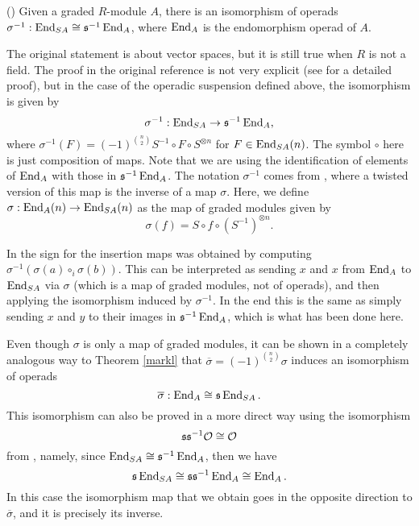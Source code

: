 \documentclass[join.tex]{subfiles}
\begin{document}
\begin{thm}\label{markl}(\cite[Chapter 3, Lemma 3.16]{operads})
Given a graded $R$-module $A$, there is an isomorphism of operads $\sigma^{-1}:\operatorname{End}_{S A}\cong \mathfrak{s}^{-1}\operatorname{End}_A$, where $\operatorname{End}_A$ is the endomorphism operad of $A$.
\end{thm}
The original statement is about vector spaces, but it is still true when $R$ is not a field. The proof in the original reference is not very explicit (see   for a detailed proof), but in the case of the operadic suspension defined above, the isomorphism is given by \[\sigma^{-1}:\operatorname{End}_{S A}\to\mathfrak{s}^{-1}\operatorname{End}_A,\] where $\sigma^{-1}(F)=(-1)^{\binom{n}{2}}S^{-1}\circ F\circ S^{\otimes n}$ for $F\in \operatorname{End}_{S A}(n)$. The symbol $\circ$ here is just composition of maps.
Note that we are using the identification of elements of $\operatorname{End}_A$ with those in $\mathfrak{s}^{-1}\operatorname{End}_A$. The notation $\sigma^{-1}$ comes from \cite{RW}, where a twisted version of this map is the inverse of a map $\sigma$. Here, we define $\sigma:\operatorname{End}_A(n)\to\operatorname{End}_{SA}(n)$ as the map of graded modules given by
\begin{equation}\label{sigma}
\sigma(f)= S\circ f \circ (S^{-1})^{\otimes n}.
\end{equation}

In \cite{RW} the sign for the insertion maps was obtained by computing $\sigma^{-1}(\sigma(a)\circ_i\sigma(b))$. This can be interpreted as sending $x$ and $x$ from $\operatorname{End}_A$ to $\operatorname{End}_{S A}$ via $\sigma$ (which is a map of graded modules, not of operads), and then applying the isomorphism induced by $\sigma^{-1}$. In the end this is the same as simply sending $x$ and $y$ to their images in $\mathfrak{s}^{-1}\operatorname{End}_A$, which is what has been done here.

Even though $\sigma$ is only a map of graded modules, it can be shown in a completely analogous way to Theorem \ref{markl} that $\overline{\sigma}=(-1)^{\binom{n}{2}}\sigma$ induces an isomorphism of operads
\begin{equation}\label{barsigma}
\overline{\sigma}:\operatorname{End}_{A}\cong\mathfrak{s}\operatorname{End}_{SA}.
\end{equation}
This isomorphism can also  be proved in a more direct way using the isomorphism \[\mathfrak{s}\mathfrak{s}^{-1}{\mathcal O}\cong{\mathcal O}\] from , namely, since $\operatorname{End}_{SA}\cong \mathfrak{s}^{-1}\operatorname{End}_A$, then we have \[\mathfrak{s}\operatorname{End}_{SA}\cong \mathfrak{s}\mathfrak{s}^{-1}\operatorname{End}_A\cong \operatorname{End}_A.\]
In this case the isomorphism map that we obtain goes in the opposite direction to $\overline{\sigma}$, and it is precisely its inverse.
\end{document}
